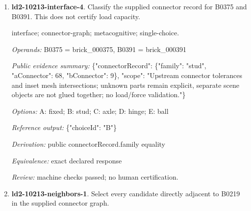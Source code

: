 \begin{enumerate}
\par{\small interface; connector-graph; metacognitive; single-choice.\par\textit{Operands:} B1248 = brick\_001248, B1244 = brick\_001244\par\textit{Public evidence summary:} \{"connectorRecord": \{"family": "hinge", "aConnector": 0, "bConnector": 5\}, "scope": "Upstream connector tolerances and inset mesh intersections; unknown parts remain explicit, separate scene objects are not glued together; no load/force validation."\}\par\textit{Options:} A: axle; B: hinge; C: fixed; D: ball; E: stud\par\textit{Reference output:} \{"choiceId": "B"\}\par\textit{Derivation:} public connectorRecord.family equality\par\textit{Equivalence:} exact declared response\par\textit{Review:} machine checks passed; no human certification.}
\item \textbf{ld2-10213-interface-4}. Classify the supplied connector record for B0375 and B0391. This does not certify load capacity.
\par{\small interface; connector-graph; metacognitive; single-choice.\par\textit{Operands:} B0375 = brick\_000375, B0391 = brick\_000391\par\textit{Public evidence summary:} \{"connectorRecord": \{"family": "stud", "aConnector": 68, "bConnector": 9\}, "scope": "Upstream connector tolerances and inset mesh intersections; unknown parts remain explicit, separate scene objects are not glued together; no load/force validation."\}\par\textit{Options:} A: fixed; B: stud; C: axle; D: hinge; E: ball\par\textit{Reference output:} \{"choiceId": "B"\}\par\textit{Derivation:} public connectorRecord.family equality\par\textit{Equivalence:} exact declared response\par\textit{Review:} machine checks passed; no human certification.}
\item \textbf{ld2-10213-neighbors-1}. Select every candidate directly adjacent to B0219 in the supplied connector graph.

\end{enumerate}
